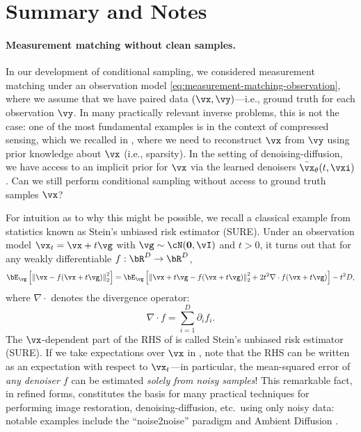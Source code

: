 \documentclass[../../book-main.tex]{subfiles}
\begin{document}
\section{Summary and Notes}
\paragraph{Measurement matching without clean samples.} In our development of
conditional sampling, we considered measurement matching under an observation
model \eqref{eq:measurement-matching-observation}, where we assume that we have
paired data $(\vx, \vy)$—i.e., ground truth for each observation $\vy$.
In many practically relevant inverse problems, this is not the case: one of the
most fundamental examples is in the context of compressed sensing, which we
recalled in , where we need to reconstruct $\vx$ from $\vy$
using prior knowledge about $\vx$ (i.e., sparsity).
In the setting of denoising-diffusion, we have access to an implicit prior for
$\vx$ via the learned denoisers $\bar{\vx}_{\theta}(t, \vxi)$. Can we still perform 
conditional sampling without access to ground truth samples $\vx$?

For intuition as to why this might be possible, we recall a classical example
from statistics known as Stein's unbiased risk estimator (SURE).
Under an observation model $\vx_t = \vx + t \vg$ with $\vg \sim \cN(\Zero,
\vI)$ and $t>0$, it turns out that for any weakly differentiable $f : \bR^D \to \bR^D$,
\begin{equation}\label{eq:sure-risk}
  \bE_{\vg}\left[
    \norm*{\vx - f(\vx + t \vg)}_2^2
    \right]
  =
  \bE_{\vg}\left[
    \norm*{\vx+t\vg - f(\vx + t \vg)}_2^2
    + 2t^2 \nabla \cdot f(\vx + t\vg)
    \right]
  - t^2 D,
\end{equation}
where $\nabla \cdot$ denotes the divergence operator:
\begin{equation*}
	\nabla \cdot f = \sum_{i=1}^D \partial_i f_i.
\end{equation*}
The $\vx$-dependent part of the RHS of  is called Stein's unbiased risk
estimator (SURE). If we take expectations over $\vx$ in ,
note that the RHS can be written as an expectation with respect to $\vx_t$---in
particular, the mean-squared error of \textit{any denoiser $f$} can be estimated
\textit{solely from noisy samples}!
This remarkable fact, in refined forms, constitutes the basis for many practical
techniques for performing image restoration, denoising-diffusion, etc.\ using
only noisy data: notable examples include the ``noise2noise'' paradigm
\cite{pmlr-v80-lehtinen18a}
and Ambient Diffusion \cite{daras2023ambient}.
\end{document}
